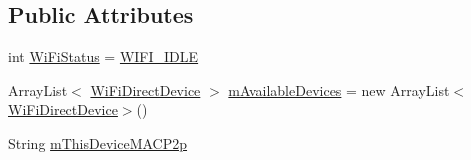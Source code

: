 \subsection*{Public Attributes}
\begin{DoxyCompactItemize}
\item 
int \hyperlink{classcom_1_1copelabs_1_1oiframework_1_1wifi_1_1_wi_fi_direct_utils_a8269883cca84fb65980b9e685d79e1f2}{Wi\+Fi\+Status} = \hyperlink{classcom_1_1copelabs_1_1oiframework_1_1wifi_1_1_wi_fi_direct_utils_a03dd6a2b2574af74def9ac920b73ecf0}{W\+I\+F\+I\+\_\+\+I\+D\+L\+E}
\item 
Array\+List$<$ \hyperlink{classcom_1_1copelabs_1_1oiframework_1_1wifi_1_1_wi_fi_direct_device}{Wi\+Fi\+Direct\+Device} $>$ \hyperlink{classcom_1_1copelabs_1_1oiframework_1_1wifi_1_1_wi_fi_direct_utils_ad20f250c50e2c301f62f5f8091718e97}{m\+Available\+Devices} = new Array\+List$<$\hyperlink{classcom_1_1copelabs_1_1oiframework_1_1wifi_1_1_wi_fi_direct_device}{Wi\+Fi\+Direct\+Device}$>$()
\item 
String \hyperlink{classcom_1_1copelabs_1_1oiframework_1_1wifi_1_1_wi_fi_direct_utils_a4d11404f56d65c345603927e3fbf0c50}{m\+This\+Device\+M\+A\+C\+P2p}
\end{DoxyCompactItemize}
